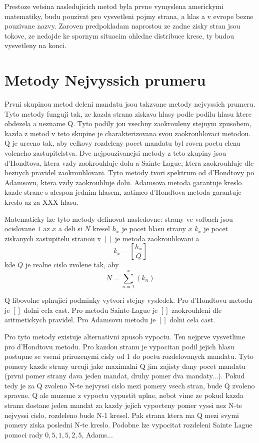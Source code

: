\documentclass[12pt,a4paper]{article}
\begin{document}
Prestoze vetsina nasledujicich metod byla prvne vymyslena americkymi matematiky, budu pouzivat pro vysvetleni pojmy strana, a hlas a v evrope bezne pouzivane nazvy. Zaroven predpokladam naprostou ze zadne zisky stran jsou tokove, ze nedojde ke spornym situacim ohledne distribuce krese, ty budou vysvetleny na konci. 

\section{Metody Nejvyssich prumeru}
Prvni skupinou metod deleni mandatu jsou takzvane metody nejvyssich prumeru. Tyto metody funguji tak, ze kazda strana ziskava hlasy podle podilu hlasu ktere obdezela a nezname Q. Tyto podily jou vsechny zaokrouleny stejnym zpusobem, kazda z metod v teto skupine je charakterizovana svou zaokrouhlovaci metodou. Q je urceno tak, aby celkovy rozdeleny pocet mandatu byl roven poctu clenu voleneho zastupitelstva. Dve nejpouzivanejsi metody z teto zkupiny jsou d'Hondtova, ktera vzdy zaokrouhluje dolu a Sainte-Lague, ktera zaokrouhluje dle beznych pravidel zaokrouhlovani. Tyto metody tvori spektrum od d'Hondtovy po Adamsovu, ktera vzdy zaokrouhluje dolu. Adamsova metoda garantuje kreslo kazde strane s alespon jednim hlasem, zatimco d'Hondtova metoda garantuje kreslo az za XXX hlasu.

Matematicky lze tyto metody definovat nasledovne:
strany ve volbach jsou ocislovane $1$ az $x$ a deli si $N$ kresel
$h_{x}$ je pocet hlasu strany $x$
$k_{x}$ je pocet ziskanych zastupitelu stranou x
$[]$ je metoda zaokrouhlovani
a
$$k_{x}=[\dfrac{h_{x}}{Q}]$$ kde $Q$ je realne cislo zvolene tak, aby $$N=\sum_{n=1}^{x} (k_{n})$$ 

Q libovolne splnujici podminky vytvori stejny vysledek. %
Pro d'Hondtovu metodu je $[]$ dolni cela cast.
Pro metodu Sainte-Lague je $[]$ zaokrouhleni dle aritmetickych pravidel.
Pro Adamsovu metodu je $[]$ dolni cela cast.

Pro tyto metody existuje alternativni zpusob vypoctu. Ten nejprve vysvetlime pro d'Hondtovu metodu. Pro kazdou stranu je vypocitan podil jejich hlasu postupne se vsemi prirozenymi cisly od 1 do poctu rozdelovanych mandatu. Tyto pomery kazde strany urcuji jake maximalni Q jim zajisty dany pocet mandatu (prvni pomer strany dava jeden mandat, druhy pomer dva mandaty...). Pokud tedy je za Q zvoleno N-te nejvyssi cislo mezi pomery vsech stran, bude Q zvoleno spravne. Q ale muzeme z vypoctu vypustit uplne, nebot vime ze pokud kazda strana dostane jeden mandat za kazdy jejich vypocteny pomer vyssi nez N-te nejvyssi cislo, rozdeleno bude N-1 kresel. Pak strana ktera ma Q mezi svymi pomery ziska posledni N-te kreslo.
Podobne lze vypocitat rozdeleni Sainte Lague pomoci rady $0{,}5, 1{,}5, 2{,}5$, Adams... %
\end{document}
